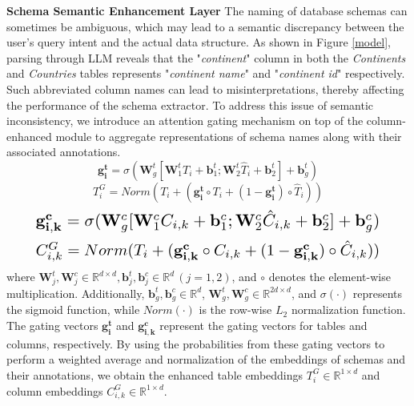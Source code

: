\documentclass[11pt]{article}
\begin{document}
\vspace{4pt}
\noindent\textbf{Schema Semantic Enhancement Layer} 
The naming of database schemas can sometimes be ambiguous, which may lead to a semantic discrepancy between the user's query intent and the actual data structure. As shown in Figure \ref{model}, parsing through LLM reveals that the "\textit{continent}" column in both the \textit{Continents} and \textit{Countries} tables represents "\textit{continent name}" and "\textit{continent id}" respectively. Such abbreviated column names can lead to misinterpretations, thereby affecting the performance of the schema extractor. To address this issue of semantic inconsistency, we introduce an attention gating mechanism on top of the column-enhanced module \cite{li2023resdsql} to aggregate representations of schema names along with their associated annotations.
\begin{equation}
    \mathbf{g_i^t} = \sigma(\mathbf{W}_g^t [\mathbf{W}_1^t T_{i} + \mathbf{b}_1^t; \mathbf{W}_2^t \hat{T}_{i} + \mathbf{b}_2^t] + \mathbf{b}_g^t)
\end{equation}
\begin{equation}
    T_{i}^{G} =Norm(T_{i}+(\mathbf{g_i^t} \circ T_{i}+(1-\mathbf{g_i^t})\circ \hat{T}_{i}))
\end{equation}
\begin{equation}
    \resizebox{.89\hsize}{!}{$
        \mathbf{g_{i,k}^c} = \sigma(\mathbf{W}_g^c [\mathbf{W}_1^c C_{i,k} + \mathbf{b}_1^c; \mathbf{W}_2^c \hat{C}_{i,k} + \mathbf{b}_2^c] + \mathbf{b}_g^c)
    $}
\end{equation}
\begin{equation}
    \resizebox{.89\hsize}{!}{$
        C_{i,k}^{G} =Norm(T_{i}+(\mathbf{g_{i,k}^c} \circ C_{i,k}+(1-\mathbf{g_{i,k}^c})\circ \hat{C}_{i,k}))
    $}
\end{equation}
where $ \mathbf{W}_j^t, \mathbf{W}_j^c \in \mathbb{R}^{d \times d}, \mathbf{b}_j^t, \mathbf{b}_j^c \in \mathbb{R}^{d} \, (j=1,2) $, and $ \circ $ denotes the element-wise multiplication. Additionally, $ \mathbf{b}_g^t, \mathbf{b}_g^c \in \mathbb{R}^{d} $, $ \mathbf{W}_g^t, \mathbf{W}_g^c \in \mathbb{R}^{2d \times d} $, and $ \sigma(\cdot) $ represents the sigmoid function, while $ Norm(\cdot) $ is the row-wise $ L_2 $ normalization function. The gating vectors $ \mathbf{g_i^t} $ and $ \mathbf{g_{i,k}^c} $ represent the gating vectors for tables and columns, respectively. By using the probabilities from these gating vectors to perform a weighted average and normalization of the embeddings of schemas and their annotations, we obtain the enhanced table embeddings $ T_{i}^{G} \in \mathbb{R}^{1 \times d} $ and column embeddings $ C_{i,k}^{G} \in \mathbb{R}^{1 \times d} $.
\end{document}

